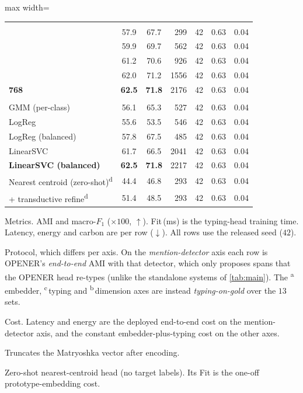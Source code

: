 \documentclass[pdflatex,sn-basic,Numbered]{sn-jnl}
\begin{document}
\begin{table}[!t]
\begin{adjustbox}{max width=\textwidth}
\begin{threeparttable}
\begin{tabular}{lccrrrr}
\addlinespace
\multicolumn{7}{l}{\emph{Matryoshka dimension}\textsuperscript{b}} \\
\quad 64                             & 57.9 & 67.7 & 299 & 42 & 0.63 & 0.04 \\
\quad 128                            & 59.9 & 69.7 & 562 & 42 & 0.63 & 0.04 \\
\quad 256                            & 61.2 & 70.6 & 926 & 42 & 0.63 & 0.04 \\
\quad 512                            & 62.0 & 71.2 & 1556 & 42 & 0.63 & 0.04 \\
\quad \textbf{768}                   & \textbf{62.5} & \textbf{71.8} & 2176 & 42 & 0.63 & 0.04 \\
\addlinespace
\multicolumn{7}{l}{\emph{Entity typing}\textsuperscript{c}} \\
\quad GMM (per-class)                & 56.1 & 65.3 & 527 & 42 & 0.63 & 0.04 \\
\quad LogReg                         & 55.6 & 53.5 & 546 & 42 & 0.63 & 0.04 \\
\quad LogReg (balanced)              & 57.8 & 67.5 & 485 & 42 & 0.63 & 0.04 \\
\quad LinearSVC                      & 61.7 & 66.5 & 2041 & 42 & 0.63 & 0.04 \\
\quad \textbf{LinearSVC (balanced)}  & \textbf{62.5} & \textbf{71.8} & 2217 & 42 & 0.63 & 0.04 \\
\quad Nearest centroid (zero-shot)\textsuperscript{d} & 44.4 & 46.8 & 293 & 42 & 0.63 & 0.04 \\
\quad \quad + transductive refine\textsuperscript{d} & 51.4 & 48.5 & 293 & 42 & 0.63 & 0.04 \\
\bottomrule
\end{tabular}
\begin{tablenotes}[flushleft]
\footnotesize
\item[] Metrics. AMI and macro-$F_1$ ($\times100$, $\uparrow$). Fit\,(ms) is the typing-head training time. Latency, energy and carbon are per row ($\downarrow$). All rows use the released seed ($42$).
\item[] Protocol, which differs per axis. On the \emph{mention-detector} axis each row is OPENER's \emph{end-to-end} AMI with that detector, which only proposes spans that the OPENER head re-types (unlike the standalone systems of \autoref{tab:main}). The \textsuperscript{a}\,embedder, \textsuperscript{c}\,typing and \textsuperscript{b}\,dimension axes are instead \emph{typing-on-gold} over the $13$ sets.
\item[] Cost. Latency and energy are the deployed end-to-end cost on the mention-detector axis, and the constant embedder-plus-typing cost on the other axes.
\item[b] Truncates the Matryoshka vector after encoding.
\item[d] Zero-shot nearest-centroid head (no target labels). Its Fit is the one-off prototype-embedding cost.
\end{tablenotes}
\end{threeparttable}
\end{adjustbox}
\end{table}
\end{document}
